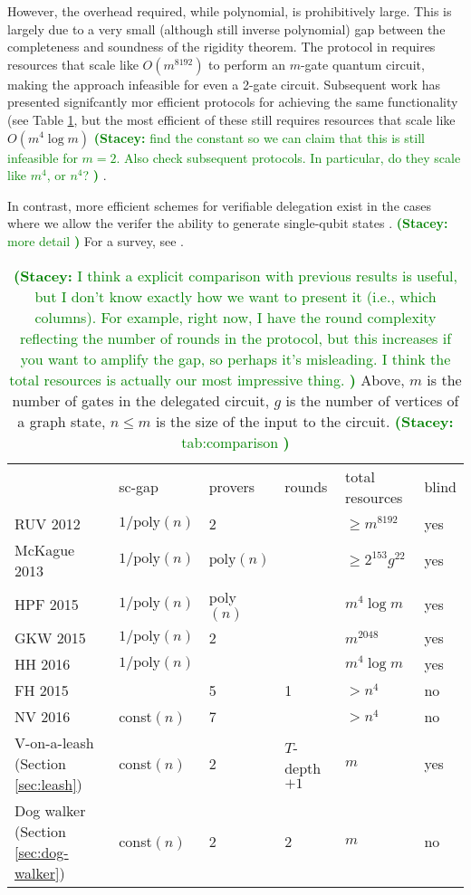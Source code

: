\documentclass[11pt]{article}
\theoremstyle{remark}
\theoremstyle{definition}
\newcommand{\snote}[1]{\textcolor{green}{\small {\textbf{(Stacey:} #1 \textbf{) }}}}
\begin{document}
However, the overhead required, while polynomial, is prohibitively large. This is largely due to a very small (although still inverse polynomial) gap between the completeness and soundness of the rigidity theorem. 
The protocol in \cite{reichardt2010classical} requires resources that scale like $O(m^{8192})$ to perform an $m$-gate quantum circuit, making the approach infeasible for even a 2-gate circuit. Subsequent work has presented signifcantly mor efficient protocols for achieving the same functionality \cite{McKague16,Gheorghiu15,hajdusek2015,hajdusek2015posthoc,natarajan2016robust} (see Table \ref{tab:comparison}, but the most efficient of these still requires resources that scale like $O(m^4\log m)$ \snote{find the constant so we can claim that this is still infeasible for $m=2$. Also check subsequent protocols. In particular, do they scale like $m^4$, or $n^4$?}.  

In contrast, more efficient schemes for verifiable delegation exist in the cases where we allow the verifer the ability to generate single-qubit states \cite{}.
\snote{more detail}
For a survey, see \cite{fitzsimons2016survey}.


\begin{table}[t]
\begin{tabular}{llllll}
& sc-gap & provers & rounds & total resources & blind\\
RUV 2012 \cite{reichardt2012classical} & $1/\mbox{poly}(n)$ &2 &  & $\geq m^{8192}$ & yes\\
McKague 2013 \cite{McKague16} & $1/\mbox{poly}(n)$ & $\mathrm{poly}(n)$ & & $\geq 2^{153}g^{22}$ & yes \\
HPF 2015 \cite{hajdusek2015} & $1/\mbox{poly}(n)$ & poly$(n)$& & $m^4\log m$ & yes \\
GKW 2015 \cite{Gheorghiu15} & $1/\mbox{poly}(n)$ & 2 & & $m^{2048}$ & yes \\
HH 2016 \cite{hayashi2016self} & $1/\mbox{poly}(n)$ & & & $m^4\log m$ & yes\\
FH 2015 \cite{hajdusek2015posthoc} & & 5 & 1 & $>n^4$ & no\\
NV 2016 \cite{natarajan2016robust} & const$(n)$ & 7 &  & $>n^4$ & no\\
V-on-a-leash (Section \ref{sec:leash})  & const$(n)$ & 2 & $T$-depth$+1$  & $m$ & yes\\
Dog walker (Section \ref{sec:dog-walker}) & const$(n)$ & 2 & 2 & $m$ & no 
\end{tabular}
\caption{\snote{I think a explicit comparison with previous results is useful, but I don't know exactly how we want to present it (i.e., which columns). For example, right now, I have the round complexity reflecting the number of rounds in the protocol, but this increases if you want to amplify the gap, so perhaps it's misleading. I think the total resources is actually our most impressive thing.}
Above, $m$ is the number of gates in the delegated circuit, $g$ is the number of vertices of a graph state, $n\leq m$ is the size of the input to the circuit. \snote{tab:comparison}}\label{tab:comparison}
\end{table}
\end{document}
